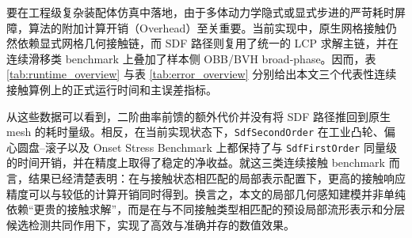 要在工程级复杂装配体仿真中落地，由于多体动力学隐式或显式步进的严苛耗时屏障，算法的附加计算开销（Overhead）至关重要。当前实现中，原生网格接触仍然依赖显式网格几何接触链，而 SDF 路径则复用了统一的 LCP 求解主链，并在连续滑移类 benchmark 上叠加了样本侧 OBB/BVH broad-phase。因而，表 \ref{tab:runtime_overview} 与表 \ref{tab:error_overview} 分别给出本文三个代表性连续接触算例上的正式运行时间和主误差指标。

从这些数据可以看到，二阶曲率前馈的额外代价并没有将 SDF 路径推回到原生 mesh 的耗时量级。相反，在当前实现状态下，\texttt{SdfSecondOrder} 在工业凸轮、偏心圆盘--滚子以及 Onset Stress Benchmark 上都保持了与 \texttt{SdfFirstOrder} 同量级的时间开销，并在精度上取得了稳定的净收益。就这三类连续接触 benchmark 而言，结果已经清楚表明：在与接触状态相匹配的局部表示配置下，更高的接触响应精度可以与较低的计算开销同时得到。换言之，本文的局部几何感知建模并非单纯依赖“更贵的接触求解”，而是在与不同接触类型相匹配的预设局部流形表示和分层候选检测共同作用下，实现了高效与准确并存的数值效果。

\begin{table}[htbp]
    \centering
    \caption{代表性连续接触 benchmark 的总运行时间对比}
    \label{tab:runtime_overview}
\end{table}

\begin{table}[htbp]
    \centering
    \caption{代表性连续接触 benchmark 的主误差指标对比}
    \label{tab:error_overview}
\end{table}
